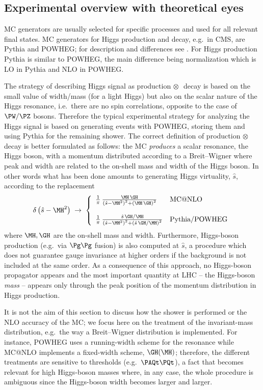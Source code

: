 \subsection{Experimental overview with theoretical eyes}
MC generators are usually selected for specific processes and used for all 
relevant final states. MC generators for Higgs production and decay, e.g.\ in 
CMS, are {\sc Pythia} and {\sc POWHEG}; for description and differences see 
.
For Higgs production {\sc Pythia} is similar to {\sc POWHEG}, the main 
difference being normalization which is LO in {\sc Pythia} and NLO in 
{\sc POWHEG}.

The strategy of describing Higgs signal as production$\,\otimes\,$ decay
is based on the small value of width/mass (for a light Higgs) but also on the 
scalar nature of the Higgs resonance, i.e.\ there are no spin correlations, 
opposite to the case of $\PW/\PZ$ bosons. 
Therefore the typical experimental strategy for analyzing the Higgs signal is 
based on generating events with {\sc POWHEG}, storing them and using 
{\sc Pythia} for the remaining shower. 
The correct definition of production$\,\otimes\,$decay is better formulated
as follows: the MC {\em produces} a scalar resonance, the Higgs boson, with a
momentum distributed according to a Breit--Wigner where peak and width are
related to the on-shell mass and width of the Higgs boson. In other words
what has been done amounts to generating Higgs virtuality, ${\hat s}$, 
according to the replacement
\[ \delta\lpar {\hat s} - \MH^2\rpar\; \rightarrow\; \left\{
\begin{array}{ll}
\frac{1}{\pi}\,\frac{\MH\,\GH}
{\lpar {\hat s} - \MH^2\rpar^2 + \lpar \MH\,\GH\rpar^2} &
\mbox{MC@NLO} 
\\ \\
\frac{1}{\pi}\,\frac{{\hat s}\,\GH/\MH}
{\lpar {\hat s} - \MH^2\rpar^2 + 
\lpar {\hat s}\,\GH/\MH\rpar^2} &
\mbox{Pythia/POWHEG} 
\end{array}
\right.
\]
where $\MH, \GH$ are the on-shell mass and width.
Furthermore, Higgs-boson production (e.g.\ via $\Pg\Pg$ fusion) is also 
computed at ${\hat s}$, a procedure which does not guarantee gauge invariance 
at higher orders if the background is not included at the same order.
As a consequence of this approach, no Higgs-boson propagator appears and
the most important quantity at LHC -- the Higgs-boson {\em mass} -- appears only
through the peak position of the momentum distribution in Higgs production.

It is not the aim of this section to discuss how the shower is performed or
the NLO accuracy of the MC; we focus here on the treatment of the invariant-mass
distribution, e.g.\ the way a Breit--Wigner distribution is implemented. 
For instance, {\sc POWHEG} uses a running-width scheme for the resonance while 
{\sc MC@NLO} implements a fixed-width scheme, $\GH(\MH)$; therefore, the 
different treatments are sensitive to thresholds (e.g.\ $\PAQt \PQt$), a fact 
that becomes relevant for high Higgs-boson masses where, in any case, the whole 
procedure is ambiguous since the Higgs-boson width becomes larger and larger. 

